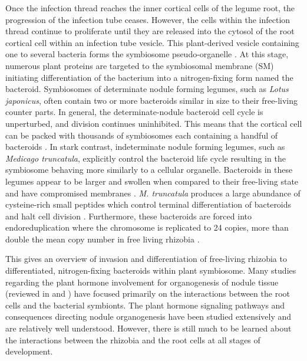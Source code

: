 Once the infection thread reaches the inner cortical cells of the legume root,
the progression of the infection tube ceases. However, the cells within the
infection thread continue to proliferate until they are released into the
cytosol of the root cortical cell within an infection tube vesicle. This
plant-derived vesicle containing one to several bacteria forms the
symbiosome pseudo-organelle \cite{Oldroyd:2011ej}. At this stage, numerous plant
proteins are targeted to the symbiosomal membrane (SM) initiating
differentiation of the bacterium into a nitrogen-fixing form named the bacteroid.  
Symbiosomes of determinate nodule forming legumes, such as \textit{Lotus japonicus}, 
often contain two or more bacteroids similar in size to their
free-living counter parts. In general, the determinate-nodule bacteroid cell
cycle is unperturbed, and division continues uninhibited. This means that the
cortical cell can be packed with thousands of symbiosomes each containing a
handful of bacteroids \cite{Ott:2009vx}. In stark contrast, 
indeterminate nodule forming legumes, such as \textit{Medicago truncatula},
explicitly control the bacteroid life cycle resulting in the symbiosome 
behaving more similarly to a cellular organelle. Bacteroids in these legumes
appear to be larger and swollen when compared to their free-living state 
\cite{Oono:2010hg} and have compromised membranes \cite{Mergaert:2006wi}. \textit{M. truncatula} produces a large abundance of
cysteine-rich small peptides which control terminal
differentiation of bacteroids and halt cell division \cite{VandeVelde:2010cn,
Farkas:2014dv}. Furthermore, these bacteroids are forced into endoreduplication
where the chromosome is replicated to 24 copies, more than double the mean copy
number in free living rhizobia \cite{Mergaert:2006wi}.

This gives an overview of invasion and differentiation of free-living rhizobia to
differentiated, nitrogen-fixing bacteroids within plant symbiosome. Many studies
regarding the plant hormone involvement for organogenesis of nodule tissue
(reviewed in \citet{Oldroyd:2004dv} and \citet{Ryu:2012dt}) have focused
primarily on the interactions between the root cells and the bacterial
symbionts. The plant hormone signaling pathways and consequences directing
nodule organogenesis have been studied extensively and are relatively well
understood. However, there is still much to be learned about the interactions
between the rhizobia and the root cells at all stages of development.  

